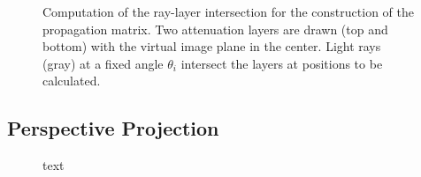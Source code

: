 \begin{figure}[htb]
	\centering
	
	\caption{Computation of the ray-layer intersection for the construction of the propagation matrix.
			 Two attenuation layers are drawn (top and bottom) with the virtual image plane in the center.
			 Light rays (gray) at a fixed angle $\theta_i$ intersect the layers at positions to be calculated.}
	\label{fig:ray_casting_oblique_projection}
\end{figure}

\subsection*{Perspective Projection}

\begin{figure}[htb]
	\centering
	
	\caption{text}
	\label{fig:ray_casting_perspective_projection}
\end{figure}
